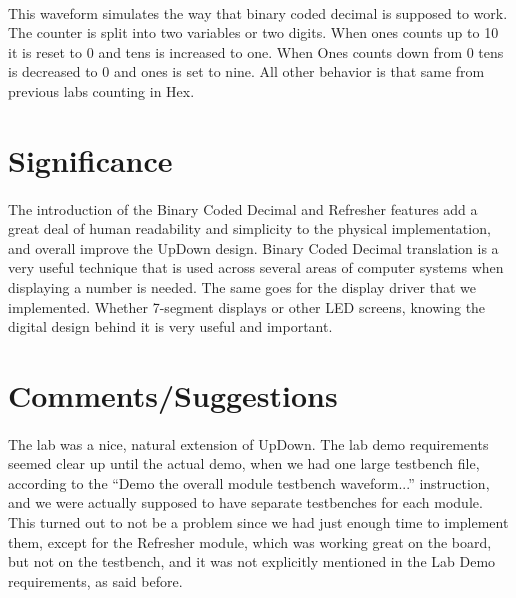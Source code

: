 \documentclass[12pt]{report}
\begin{document}
				\paragraph*{}
				This waveform simulates the way that binary coded decimal is supposed to work.  The counter is split into two variables or two digits.  When ones counts up to 10 it is reset to 0 and tens is increased to one.  When Ones counts down from 0 tens is decreased to 0 and ones is set to nine.  All other behavior is that same from previous labs counting in Hex.
			
\section*{Significance}
	\paragraph{}
		The introduction of the Binary Coded Decimal and Refresher features add a great deal of human readability and simplicity to the physical implementation, and overall improve the UpDown design. Binary Coded Decimal translation is a very useful technique that is used across several areas of computer systems when displaying a number is needed. The same goes for the display driver that we implemented. Whether 7-segment displays or other LED screens, knowing the digital design behind it is very useful and important.

\section*{Comments/Suggestions}
	\paragraph{}
		The lab was a nice, natural extension of UpDown. The lab demo requirements seemed clear up until the actual demo, when we had one large testbench file, according to the ``Demo the overall module testbench waveform...'' instruction, and we were actually supposed to have separate testbenches for each module. This turned out to not be a problem since we had just enough time to implement them, except for the Refresher module, which was working great on the board, but not on the testbench, and it was not explicitly mentioned in the Lab Demo requirements, as said before.
		
\end{document}
